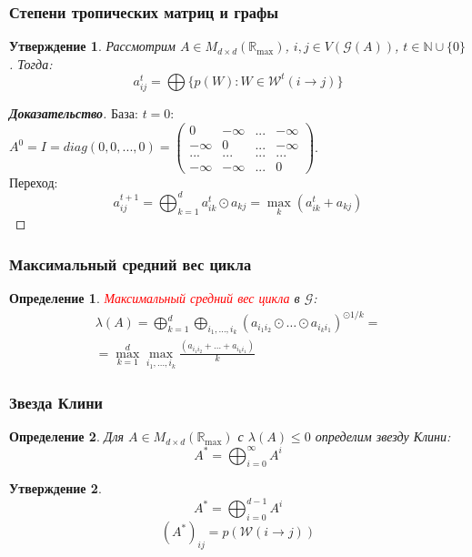 \documentclass{beamer}
\newtheorem*{Def}{Определение}
\newtheorem*{Prop}{Утверждение}
\newcommand{\cred}[1]{\textcolor{red}{#1}}
\begin{document}
\begin{frame}
\frametitle{Степени тропических матриц и графы}
\begin{Prop}
Рассмотрим $A \in M_{d \times d}(\mathbb{R}_{\max})$, $i, j \in V(\mathcal{G}(A))$, $t \in \mathbb{N} \cup \{0\}$. Тогда:\begin{equation*}
    a_{ij}^t = \bigoplus \{p(W): W \in \mathcal{W}^t(i \rightarrow j)\}
\end{equation*}
\end{Prop}
\begin{proof}[\textbf{Доказательство}]
База: $t = 0$: $A^0 = I = diag(0, 0, ..., 0) = \begin{pmatrix}
0 & -\infty & ... & -\infty \\
-\infty & 0 &... & -\infty \\
...     & ... & ... & ... \\
-\infty & -\infty & ...  & 0
\end{pmatrix}$.\\
Переход:
\begin{equation*}
    a_{ij}^{t + 1} = \bigoplus_{k = 1}^{d} a_{ik}^t \odot a_{kj} = \max_k (a_{ik}^t + a_{kj})
\end{equation*}
\end{proof}

\end{frame}

\begin{frame}
\frametitle{Максимальный средний вес цикла}
\begin{Def}
\cred{Максимальный средний вес цикла} в $\mathcal{G}$:
\begin{equation*}
    \begin{split}
        \lambda(A) = \bigoplus_{k = 1}^d \bigoplus_{i_1, \dots, i_k} (a_{{i_1}{i_2}}\odot \dots \odot a_{{i_k}{i_1}})^{\odot{1/k}} =\\
        =\max_{k = 1}^d \max_{i_1, \dots, i_k} \frac{(a_{{i_1}{i_2}} + \dots + a_{{i_k}{i_1}})}{k}
    \end{split}
\end{equation*}
\end{Def}
\end{frame}


\begin{frame}
\frametitle{Звезда Клини}
\begin{Def}
Для $A \in M_{d \times d}(\mathbb{R}_{\max})$ с $\lambda(A) \le 0$ определим звезду Клини:
\begin{equation*}
	A^* = \bigoplus_{i = 0}^{\infty} A^i
\end{equation*}
\end{Def}
\begin{Prop}
\begin{equation*}
	A^* = \bigoplus_{i = 0}^{d - 1} A^i
\end{equation*}
\begin{equation*}
	(A^*)_{ij} = p(\mathcal{W}(i \rightarrow j))
\end{equation*}
\end{Prop}
\end{frame}
\end{document}
